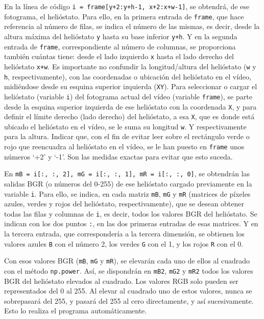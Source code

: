 En la línea de código \verb|i = frame[y+2:y+h-1, x+2:x+w-1]|, se obtendrá, de ese fotograma, el helióstato. Para ello, en la primera entrada de \verb|frame|, que hace referencia al número de filas, se indica el número de las mismas, es decir, desde la altura máxima del helióstato \verb|y| hasta su base inferior \verb|y+h|. Y en la segunda entrada de \verb|frame|, correspondiente al número de columnas, se proporciona también cuántas tiene: desde el lado izquierdo \verb|x| hasta el lado derecho del helióstato \verb|x+w|. Es importante no confundir la longitud/altura del helióstato (\verb|w| y \verb|h|, respectivamente), con las coordenadas o ubicación del helióstato en el vídeo, midiéndose desde su esquina superior izquierda (\verb|XY|). Para seleccionar o cargar el helióstato (variable \verb|i|) del fotograma actual del vídeo (variable \verb|frame|), se parte desde la esquina superior izquierda de ese helióstato con la coordenada \verb|X|, y para definir el límite derecho (lado derecho) del helióstato, a esa \verb|X|, que es donde está ubicado el helióstato en el vídeo, se le suma su longitud \verb|w|. Y respectivamente para la altura. Indicar que, con el fin de evitar leer sobre el rectángulo verde o rojo que reencuadra al helióstato en el vídeo, se le han puesto en \verb|frame| unos números ‘+2’ y ‘-1’. Son las medidas exactas para evitar que esto suceda.

En \verb|mB = i[:, :, 2], mG = i[:, :, 1], mR = i[:, :, 0]|, se obtendrán las salidas BGR (o números del 0-255) de ese helióstato cargado previamente en la variable \verb|i|. Para ello, se indica, en cada matriz \verb|mB|, \verb|mG| y \verb|mR| (matrices de píxeles azules, verdes y rojos del helióstato, respectivamente), que se desean obtener todas las filas y columnas de \verb|i|, es decir, todos los valores BGR del helióstato. Se indican con los dos puntos \verb|:|, en las dos primeras entradas de esas matrices. Y en la tercera entrada, que correspondería a la tercera dimensión, se obtienen los valores azules \verb|B| con el número 2, los verdes \verb|G| con el 1, y los rojos \verb|R| con el 0.

Con esos valores BGR (\verb|mB|, \verb|mG| y \verb|mR|), se elevarán cada uno de ellos al cuadrado con el método \verb|np.power|. Así, se dispondrán en \verb|mB2|, \verb|mG2| y \verb|mR2| todos los valores BGR del helióstato elevados al cuadrado. Los valores RGB solo pueden ser representados del 0 al 255. Al elevar al cuadrado uno de estos valores, nunca se sobrepasará del 255, y pasará del 255 al cero directamente, y así sucesivamente. Esto lo realiza el programa automáticamente.

